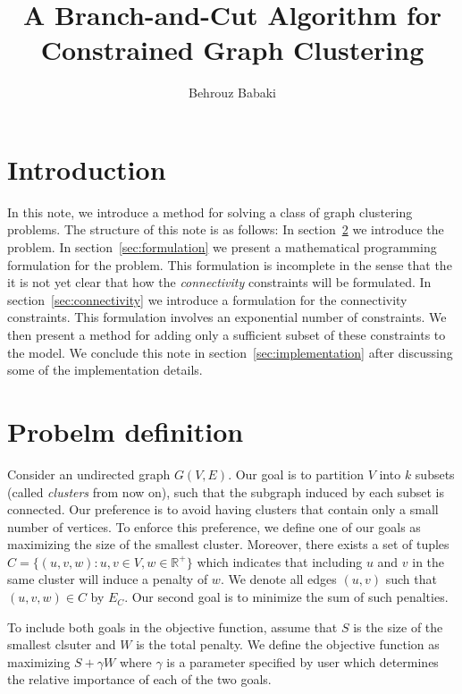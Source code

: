 \documentclass[]{article}
\begin{document}
\title{A Branch-and-Cut Algorithm for Constrained Graph Clustering}
\author{Behrouz Babaki}
\date{}
\maketitle

\section{Introduction}
\label{introduction}

In this note, we introduce a method for solving a class of graph
clustering problems. The structure of this note is as follows: In
section~\ref{sec:definition} we introduce the problem. In
section~\ref{sec:formulation} we present a mathematical programming
formulation for the problem. This formulation is incomplete in the
sense that the it is not yet clear that how the \emph{connectivity}
constraints will be formulated. In section~\ref{sec:connectivity} we
introduce a formulation for the connectivity constraints. This
formulation involves an exponential number of constraints. We then
present a method for adding only a sufficient subset of these
constraints to the model. We conclude this note in section~\ref{sec:implementation} after 
discussing some of the implementation details.

\section{Probelm definition}
\label{sec:definition}

Consider an undirected graph $G(V, E)$. Our goal is to partition $V$
into $k$ subsets (called \emph{clusters} from now on), such that the
subgraph induced by each subset is connected. Our preference is to avoid
having clusters that contain only a small number of vertices. To enforce
this preference, we define one of our goals as maximizing the size of
the smallest cluster. Moreover, there exists a set of tuples
$C = \{(u, v, w): u, v \in V, w \in \mathbb{R}^+\}$ which indicates that
including $u$ and $v$ in the same cluster will induce a penalty of $w$. We denote all edges $(u, v)$ such that $(u, v, w) \in C$ by $E_C$. Our second goal is to minimize the sum of such penalties.

To include both goals in the objective function, assume that $S$ is the
size of the smallest clsuter and $W$ is the total penalty. We define the
objective function as maximizing $S + \gamma W$ where $\gamma$ is a
parameter specified by user which determines the relative importance of
each of the two goals.
\end{document}

